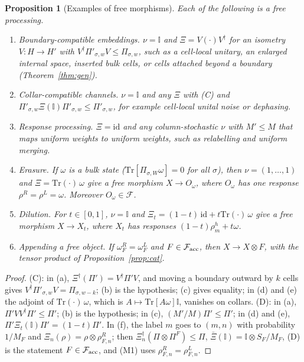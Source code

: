 \documentclass[11pt]{article}
\newtheorem{proposition}[theorem]{Proposition}
\theoremstyle{definition}
\theoremstyle{remark}
\newcommand{\Tr}{\mathrm{Tr}}
\newcommand{\one}{\mathbb{I}}
\newcommand{\Free}{\mathcal{F}}
\begin{document}
\begin{proposition}[Examples of free morphisms]\label{prop:examples}
Each of the following is a free processing.
\begin{enumerate}
\item[(a)] \emph{Boundary-compatible embeddings.} $\nu=\one$ and $\Xi=V(\cdot)V^\dagger$ for an isometry $V:H\to H'$ with $V^\dagger\Pi'_{\sigma,w}V\le\Pi_{\sigma,w}$, such as a cell-local unitary, an enlarged internal space, inserted bulk cells, or cells attached beyond a boundary (Theorem~\ref{thm:gen}).
\item[(b)] \emph{Collar-compatible channels.} $\nu=\one$ and any $\Xi$ with (C) and $\Pi'_{\sigma,w}\Xi(\one)\Pi'_{\sigma,w}\le\Pi'_{\sigma,w}$, for example cell-local unital noise or dephasing.
\item[(c)] \emph{Response processing.} $\Xi=\mathrm{id}$ and any column-stochastic $\nu$ with $M'\le M$ that maps uniform weights to uniform weights, such as relabelling and uniform merging.
\item[(d)] \emph{Erasure.} If $\omega$ is a bulk state ($\Tr[\Pi_{\sigma,W}\omega]=0$ for all $\sigma$), then $\nu=(1,\dots,1)$ and $\Xi=\Tr(\cdot)\,\omega$ give a free morphism $X\to O_\omega$, where $O_\omega$ has one response $\rho^R=\rho^L=\omega$. Moreover $O_\omega\in\Free$.
\item[(e)] \emph{Dilution.} For $t\in[0,1]$, $\nu=\one$ and $\Xi_t=(1-t)\,\mathrm{id}+t\Tr(\cdot)\,\omega$ give a free morphism $X\to X_t$, where $X_t$ has responses $(1-t)\rho^h_m+t\omega$.
\item[(f)] \emph{Appending a free object.} If $\omega^R_F=\omega^L_F$ and $F\in\Free_{\rm acc}$, then $X\to X\otimes F$, with the tensor product of Proposition~\ref{prop:cat}.
\end{enumerate}
\end{proposition}
\begin{proof}
(C): in (a), $\Xi^\dagger(\Pi')=V^\dagger\Pi'V$, and moving a boundary outward by $k$ cells gives $V^\dagger\Pi'_{\sigma,w}V=\Pi_{\sigma,w-k}$; (b) is the hypothesis; (c) gives equality; in (d) and (e) the adjoint of $\Tr(\cdot)\,\omega$, which is $A\mapsto\Tr[A\omega]\one$, vanishes on collars. (D): in (a), $\Pi'VV^\dagger\Pi'\le\Pi'$; (b) is the hypothesis; in (c), $(M'/M)\Pi'\le\Pi'$; in (d) and (e), $\Pi'\Xi_t(\one)\Pi'=(1-t)\Pi'$. In (f), the label $m$ goes to $(m,n)$ with probability $1/M_F$ and $\Xi_n(\rho)=\rho\otimes\rho^R_{F,n}$; then $\Xi_n^\dagger(\Pi\otimes\Pi^F)\le\Pi$, $\bar\Xi(\one)=\one\otimes S_F/M_F$, (D) is the statement $F\in\Free_{\rm acc}$, and (M1) uses $\rho^R_{F,n}=\rho^L_{F,n}$.
\end{proof}
\end{document}
